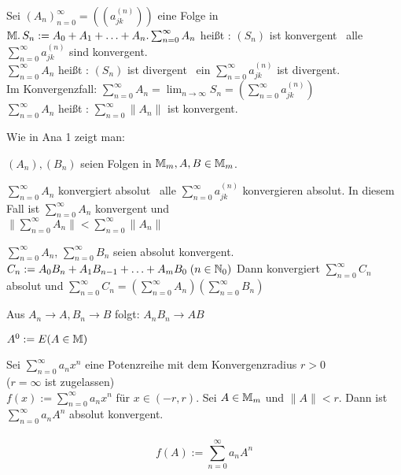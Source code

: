 \documentclass[a4paper,twoside,DIV15,BCOR12mm]{scrbook}
\begin{document}
\begin{definition}
Sei $(A_n)_{n=0}^\infty = ((a_{jk}^{(n)}))$ eine Folge in $\mathbb{M}. \, S_n := A_0 + A_1 + \ldots + A_n. \\
\sum_{n=0}^{\infty}A_n $ heißt  : \equizu $ (S_n)$ ist konvergent \equizu \, alle $\sum_{n=0}^{\infty}a_{jk}^{(n)}$ sind konvergent. \\
$\sum_{n=0}^{\infty}A_n $ heißt  : \equizu $ (S_n)$ ist divergent \equizu \, ein $\sum_{n=0}^{\infty}a_{jk}^{(n)}$ ist divergent. \\
Im Konvergenzfall: $\sum_{n=0}^{\infty} A_n = \lim_{n \rightarrow \infty} S_n = (\sum_{n=0}^{\infty} a_{jk}^{(n)})$ \\
$\sum_{n=0}^{\infty} A_n$ heißt  : \equizu $\sum_{n=0}^{\infty} \|A_n\|$ ist konvergent.

Wie in Ana 1 zeigt man:
\end{definition}

\begin{satz}
$(A_n), (B_n)$ seien Folgen in $\mathbb{M}_m, A, B \in \mathbb{M}_m$.
\begin{liste}
\item $\sum_{n=0}^{\infty}A_n$ konvergiert absolut \equizu \, alle $\sum_{n=0}^{\infty} a_{jk}^{(n)}$ konvergieren absolut. In diesem Fall ist $\sum_{n=0}^{\infty}A_n$ konvergent und \\
$\|\sum_{n=0}^{\infty}A_n\| < \sum_{n=0}^{\infty}\|A_n\|$
\item $\sum_{n=0}^{\infty}A_n $, $\sum_{n=0}^{\infty}B_n$ seien absolut konvergent. \\
$C_n := A_0B_n + A_1B_{n-1} + \ldots + A_mB_0 \; (n \in \mathbb{N}_0)$
Dann konvergiert $\sum_{n=0}^{\infty}C_n$ absolut und $\sum_{n=0}^{\infty}C_n = (\sum_{n=0}^{\infty}A_n)(\sum_{n=0}^{\infty}B_n)$
\item Aus $A_n \rightarrow A, B_n \rightarrow B$ folgt: $A_nB_n \rightarrow AB$
\end{liste}
\end{satz} 

\begin{definition}
$A^0 := E (A \in \mathbb{M})$
\end{definition}

\begin{satz}
Sei $\sum_{n=0}^{\infty}a_nx^n$ eine Potenzreihe mit dem Konvergenzradius $r > 0$ \\ ($r = \infty$ ist zugelassen) \\ 
$f(x) := \sum_{n=0}^{\infty}a_nx^n$ für $x \in (-r, r)$. Sei $A \in \mathbb{M}_m$ und $\|A\| < r$. Dann ist $\sum_{n=0}^{\infty}a_nA^n$ absolut konvergent.\\\\
$$f(A) := \sum_{n=0}^{\infty}a_nA^n$$
\end{satz}
\end{document}
